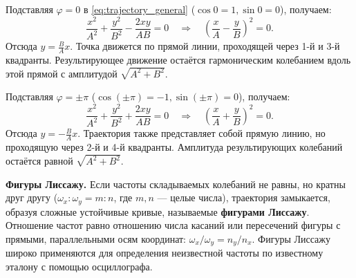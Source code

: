\begin{property}[Случай $\varphi = 0$]
Подставляя $\varphi = 0$ в \eqref{eq:trajectory_general} ($\cos 0 = 1, \sin 0 = 0$), получаем:
\begin{equation}
    \frac{x^2}{A^2} + \frac{y^2}{B^2} - \frac{2xy}{AB} = 0 \quad \Rightarrow \quad \left(\frac{x}{A} - \frac{y}{B}\right)^2 = 0.
\end{equation}
Отсюда $y = \frac{B}{A}x$. Точка движется по прямой линии, проходящей через 1-й и 3-й квадранты. Результирующее движение остаётся гармоническим колебанием вдоль этой прямой с амплитудой $\sqrt{A^2 + B^2}$.
\end{property}

\begin{property}[Случай $\varphi = \pm \pi$]
Подставляя $\varphi = \pm \pi$ ($\cos(\pm\pi) = -1, \sin(\pm\pi) = 0$), получаем:
\begin{equation}
    \frac{x^2}{A^2} + \frac{y^2}{B^2} + \frac{2xy}{AB} = 0 \quad \Rightarrow \quad \left(\frac{x}{A} + \frac{y}{B}\right)^2 = 0.
\end{equation}
Отсюда $y = -\frac{B}{A}x$. Траектория также представляет собой прямую линию, но проходящую через 2-й и 4-й квадранты. Амплитуда результирующих колебаний остаётся равной $\sqrt{A^2 + B^2}$.
\end{property}

\begin{remark}
\textbf{Фигуры Лиссажу.} Если частоты складываемых колебаний не равны, но кратны друг другу ($\omega_x : \omega_y = m : n$, где $m, n$ --- целые числа), траектория замыкается, образуя сложные устойчивые кривые, называемые \textbf{фигурами Лиссажу}. Отношение частот равно отношению числа касаний или пересечений фигуры с прямыми, параллельными осям координат: $\omega_x / \omega_y = n_y / n_x$. Фигуры Лиссажу широко применяются для определения неизвестной частоты по известному эталону с помощью осциллографа.
\end{remark}

\vspace{1cm}

